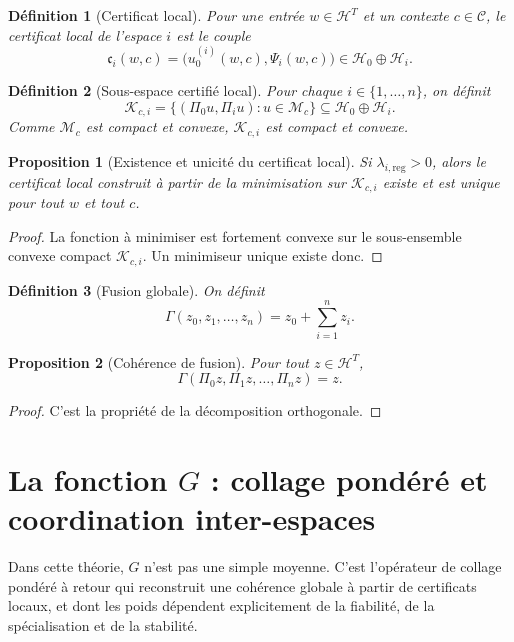 \documentclass[11pt,a4paper]{article}
\newtheorem{definition}{Définition}[section]
\newtheorem{proposition}{Proposition}[section]
\newcommand{\C}{\mathcal C}
\newcommand{\Hh}{\mathcal H}
\newcommand{\Mcal}{\mathcal M}
\newcommand{\1}{\mathbf 1}
\begin{document}
\begin{definition}[Certificat local]
Pour une entrée \(w\in\Hh^T\) et un contexte \(c\in\C\), le certificat local de l'espace \(i\) est le couple
\[
\mathfrak c_i(w,c)=\bigl(u_0^{(i)}(w,c),\Psi_i(w,c)\bigr)\in \Hh_0\oplus \Hh_i.
\]
\end{definition}

\begin{definition}[Sous-espace certifié local]
Pour chaque \(i\in\{1,\dots,n\}\), on définit
\[
\mathcal K_{c,i}
=
\{(\Pi_0 u,\Pi_i u): u\in \Mcal_c\}
\subseteq \Hh_0\oplus \Hh_i.
\]
Comme \(\Mcal_c\) est compact et convexe, \(\mathcal K_{c,i}\) est compact et convexe.
\end{definition}

\begin{proposition}[Existence et unicité du certificat local]
Si \(\lambda_{i,\mathrm{reg}}>0\), alors le certificat local construit à partir de la minimisation sur \(\mathcal K_{c,i}\) existe et est unique pour tout \(w\) et tout \(c\).
\end{proposition}

\begin{proof}
La fonction à minimiser est fortement convexe sur le sous-ensemble convexe compact \(\mathcal K_{c,i}\).  
Un minimiseur unique existe donc.
\end{proof}

\begin{definition}[Fusion globale]
On définit
\[
\Gamma(z_0,z_1,\dots,z_n)=z_0+\sum_{i=1}^n z_i.
\]
\end{definition}

\begin{proposition}[Cohérence de fusion]
Pour tout \(z\in\Hh^T\),
\[
\Gamma(\Pi_0 z,\Pi_1 z,\dots,\Pi_n z)=z.
\]
\end{proposition}

\begin{proof}
C'est la propriété de la décomposition orthogonale.
\end{proof}

\section{La fonction \(G\) : collage pondéré et coordination inter-espaces}

Dans cette théorie, \(G\) n'est pas une simple moyenne.  
C'est l'opérateur de collage pondéré à retour qui reconstruit une cohérence globale à partir de certificats locaux, et dont les poids dépendent explicitement de la fiabilité, de la spécialisation et de la stabilité.
\end{document}
